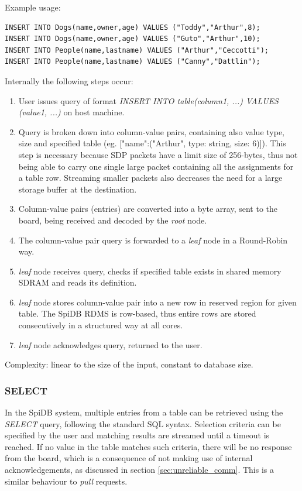 Example usage:
\begin{lstlisting}
INSERT INTO Dogs(name,owner,age) VALUES ("Toddy","Arthur",8);
INSERT INTO Dogs(name,owner,age) VALUES ("Guto","Arthur",10);
INSERT INTO People(name,lastname) VALUES ("Arthur","Ceccotti");
INSERT INTO People(name,lastname) VALUES ("Canny","Dattlin");
\end{lstlisting}

Internally the following steps occur:
\begin{enumerate}
\item User issues query of format \textit{INSERT INTO table(column1, ...) VALUES (value1, ...)} on host machine.
\item Query is broken down into column-value pairs, containing also value type, size and specified table (eg. ["name":("Arthur", type: string, size: 6)]). This step is necessary because SDP packets have a limit size of 256-bytes, thus not being able to carry one single large packet containing all the assignments for a table row. Streaming smaller packets also decreases the need for a large storage buffer at the destination.\cite{sdp}
\item Column-value pairs (entries) are converted into a byte array, sent to the board, being received and decoded by the \textit{root} node.
\item The column-value pair query is forwarded to a \textit{leaf} node in a Round-Robin way.
\item \textit{leaf} node receives query, checks if specified table exists in shared memory SDRAM and reads its definition.
\item \textit{leaf} node stores column-value pair into a new row in reserved region for given table. The SpiDB RDMS is row-based, thus entire rows are stored consecutively in a structured way at all cores.
\item \textit{leaf} node acknowledges query, returned to the user.
\end{enumerate}

Complexity: linear to the size of the input, constant to database size.

\subsubsection{SELECT}   
In the SpiDB system, multiple entries from a table can be retrieved using the \textit{SELECT} query, following the standard SQL syntax. Selection criteria can be specified by the user and matching results are streamed until a timeout is reached. If no value in the table matches such criteria, there will be no response from the board, which is a consequence of not making use of internal acknowledgements, as discussed in section \ref{sec:unreliable_comm}. This is a similar behaviour to \textit{pull} requests. 

